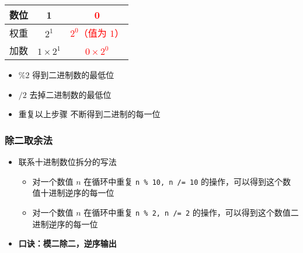\begin{frame}[fragile]
{\begin{tabular}{|c|c|c|}
        \hline
        数位  & 1   & \textcolor{red}{0} \\ \hline
        权重  & $2^1$ & \textcolor{red}{$2^0$（值为 $1$）}  \\ \hline
        加数  & $1 \times 2^1$ & \textcolor{red}{$0 \times 2^0$}  \\ \hline
        \end{tabular}
    }  
    
    \begin{itemize}
        \item<2-> $\% 2$ 得到二进制数的最低位
        \item<3-> $/ 2$ 去掉二进制数的最低位
        \item<4-> 重复以上步骤 不断得到二进制的每一位
    \end{itemize}

\end{frame}

\begin{frame}[fragile]
    \frametitle{除二取余法}

    \begin{itemize}
        \item 联系十进制数位拆分的写法
        \begin{itemize}
           \item 对一个数值 $n$ 在循环中重复 \lstinline|n % 10, n /= 10| 的操作，可以得到这个数值十进制逆序的每一位
           \item 对一个数值 $n$ 在循环中重复 \lstinline|n % 2, n /= 2| 的操作，可以得到这个数值二进制逆序的每一位
        \end{itemize}
        
        \item \textbf{口诀：模二除二，逆序输出}
    \end{itemize}

\end{frame}

